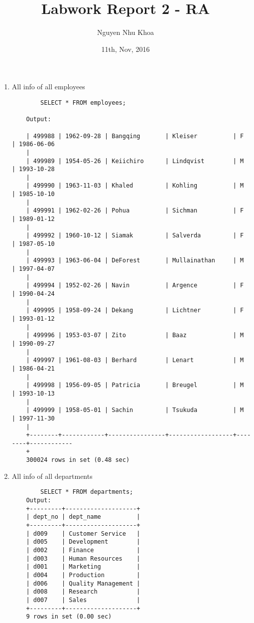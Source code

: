 \documentclass[12pt, letterpaper, twoside]{article}
\title{Labwork Report 2 - RA}
\author{Nguyen Nhu Khoa}
\date{11th, Nov, 2016}
\begin{document}
	\begin{enumerate}
		\item All info of all employees\\
		\begin{verbatim}
		SELECT * FROM employees;

	Output:
	
	| 499988 | 1962-09-28 | Bangqing       | Kleiser          | F      | 1986-06-06
	|
	| 499989 | 1954-05-26 | Keiichiro      | Lindqvist        | M      | 1993-10-28
	|
	| 499990 | 1963-11-03 | Khaled         | Kohling          | M      | 1985-10-10
	|
	| 499991 | 1962-02-26 | Pohua          | Sichman          | F      | 1989-01-12
	|
	| 499992 | 1960-10-12 | Siamak         | Salverda         | F      | 1987-05-10
	|
	| 499993 | 1963-06-04 | DeForest       | Mullainathan     | M      | 1997-04-07
	|
	| 499994 | 1952-02-26 | Navin          | Argence          | F      | 1990-04-24
	|
	| 499995 | 1958-09-24 | Dekang         | Lichtner         | F      | 1993-01-12
	|
	| 499996 | 1953-03-07 | Zito           | Baaz             | M      | 1990-09-27
	|
	| 499997 | 1961-08-03 | Berhard        | Lenart           | M      | 1986-04-21
	|
	| 499998 | 1956-09-05 | Patricia       | Breugel          | M      | 1993-10-13
	|
	| 499999 | 1958-05-01 | Sachin         | Tsukuda          | M      | 1997-11-30
	|
	+--------+------------+----------------+------------------+--------+------------
	+
	300024 rows in set (0.48 sec)

		\end{verbatim}
		
		\item All info of all departments \\
		\begin{verbatim}
		SELECT * FROM departments;
	Output:
	+---------+--------------------+
	| dept_no | dept_name          |
	+---------+--------------------+
	| d009    | Customer Service   |
	| d005    | Development        |
	| d002    | Finance            |
	| d003    | Human Resources    |
	| d001    | Marketing          |
	| d004    | Production         |
	| d006    | Quality Management |
	| d008    | Research           |
	| d007    | Sales              |
	+---------+--------------------+
	9 rows in set (0.00 sec)
		\end{verbatim}
		

\end{enumerate}
\end{document}
